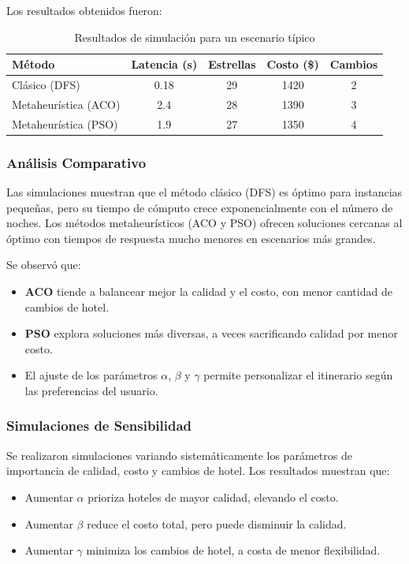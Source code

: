 \documentclass[runningheads]{llncs}
\begin{document}
Los resultados obtenidos fueron:

\begin{table}[H]
\centering
\begin{tabular}{lcccc}
\toprule
\textbf{Método} & \textbf{Latencia (s)} & \textbf{Estrellas} & \textbf{Costo (\$)} & \textbf{Cambios} \\
\midrule
Clásico (DFS) & 0.18 & 29 & 1420 & 2 \\
Metaheurística (ACO) & 2.4 & 28 & 1390 & 3 \\
Metaheurística (PSO) & 1.9 & 27 & 1350 & 4 \\
\bottomrule
\end{tabular}
\caption{Resultados de simulación para un escenario típico}
\end{table}

\subsubsection{Análisis Comparativo}

Las simulaciones muestran que el método clásico (DFS) es óptimo para instancias pequeñas, pero su tiempo de cómputo crece exponencialmente con el número de noches. Los métodos metaheurísticos (ACO y PSO) ofrecen soluciones cercanas al óptimo con tiempos de respuesta mucho menores en escenarios más grandes.

Se observó que:
\begin{itemize}
    \item \textbf{ACO} tiende a balancear mejor la calidad y el costo, con menor cantidad de cambios de hotel.
    \item \textbf{PSO} explora soluciones más diversas, a veces sacrificando calidad por menor costo.
    \item El ajuste de los parámetros $\alpha$, $\beta$ y $\gamma$ permite personalizar el itinerario según las preferencias del usuario.
\end{itemize}

\subsubsection{Simulaciones de Sensibilidad}

Se realizaron simulaciones variando sistemáticamente los parámetros de importancia de calidad, costo y cambios de hotel. Los resultados muestran que:
\begin{itemize}
    \item Aumentar $\alpha$ prioriza hoteles de mayor calidad, elevando el costo.
    \item Aumentar $\beta$ reduce el costo total, pero puede disminuir la calidad.
    \item Aumentar $\gamma$ minimiza los cambios de hotel, a costa de menor flexibilidad.
\end{itemize}
\end{document}
